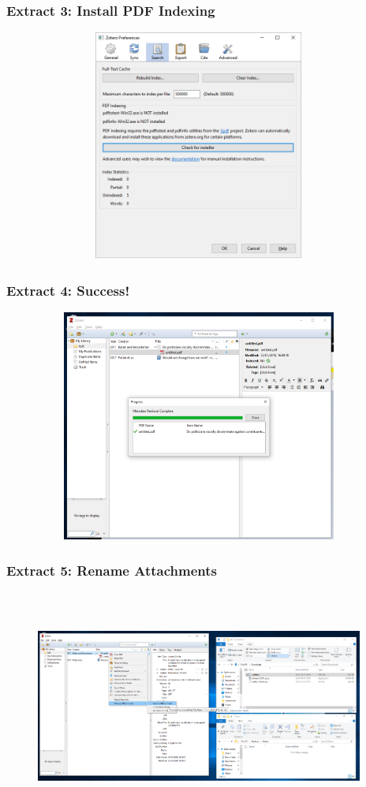 \documentclass[12pt]{beamer}
\begin{document}
\begin{frame} \frametitle{Extract 3: Install PDF Indexing} \begin{figure}[!h] \centering
	\includegraphics[height=3in, width = 4.25in,keepaspectratio]{zotero/extract_3.png}
\end{figure} \end{frame}

\begin{frame} \frametitle{Extract 4: Success!} \begin{figure}[!h] \centering
	\includegraphics[height=3in, width = 4.25in,keepaspectratio]{zotero/extract_4.png}
\end{figure} \end{frame}

\begin{frame} \frametitle{Extract 5: Rename Attachments} \begin{figure}[!h] \centering
	\includegraphics[height=3in, width = 4.25in,keepaspectratio]{zotero/extract_5.png}
\end{figure} \end{frame}
\end{document}
